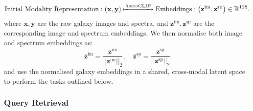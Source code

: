 \documentclass[a4paper,12pt]{article}
\begin{document}
\begin{equation}
    \text{Initial Modality Representation} : \left( \mathbf{x}, \mathbf{y} \right) \xmapsto{\text{AstroCLIP}} \text{Embeddings} : \left( \mathbf{z}^{\text{im}}, \mathbf{z}^{\text{sp}} \right) \in \mathbb{R}^{128}.
\end{equation}
where $\mathbf{x}, \mathbf{y}$ are the raw galaxy images and spectra, and $\mathbf{z}^{\text{im}}, \mathbf{z}^{\text{sp}}$ are the corresponding image and spectrum embeddings. We then normalise both image and spectrum embeddings as:
\begin{equation}
    \mathbf{\bar{z}}^{\text{im}} =  \frac{\mathbf{z}^{\text{im}} }{|| \mathbf{z}^{\text{im}} ||_2}, \quad \mathbf{\bar{z}}^{\text{sp}} =  \frac{\mathbf{z}^{\text{sp}} }{|| \mathbf{z}^{\text{sp}} ||_2}
\end{equation}
and use the normalised galaxy embeddings in a shared, cross-modal latent space to perform the tasks outlined below.


\subsubsection{Query Retrieval}

\end{document}

